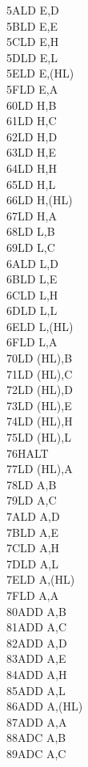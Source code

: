 \documentclass[twoside,openright,a4paper]{book}
\begin{document}
\begin{multicols}{3}
{\begin{tabbing}
	5A\>LD E,D\\
	5B\>LD E,E\\
	5C\>LD E,H\\
	5D\>LD E,L\\
	5E\>LD E,(HL)\\
	5F\>LD E,A\\
	60\>LD H,B\\
	61\>LD H,C\\
	62\>LD H,D\\
	63\>LD H,E\\
	64\>LD H,H\\
	65\>LD H,L\\
	66\>LD H,(HL)\\
	67\>LD H,A\\
	68\>LD L,B\\
	69\>LD L,C\\
	6A\>LD L,D\\
	6B\>LD L,E\\
	6C\>LD L,H\\
	6D\>LD L,L\\
	6E\>LD L,(HL)\\
	6F\>LD L,A\\
	70\>LD (HL),B\\
	71\>LD (HL),C\\
	72\>LD (HL),D\\
	73\>LD (HL),E\\
	74\>LD (HL),H\\
	75\>LD (HL),L\\
	76\>HALT\\
	77\>LD (HL),A\\
	78\>LD A,B\\
	79\>LD A,C\\
	7A\>LD A,D\\
	7B\>LD A,E\\
	7C\>LD A,H\\
	7D\>LD A,L\\
	7E\>LD A,(HL)\\
	7F\>LD A,A\\
	80\>ADD A,B\\
	81\>ADD A,C\\
	82\>ADD A,D\\
	83\>ADD A,E\\
	84\>ADD A,H\\
	85\>ADD A,L\\
	86\>ADD A,(HL)\\
	87\>ADD A,A\\
	88\>ADC A,B\\
	89\>ADC A,C\\

\end{tabbing}}
\end{multicols}
\end{document}
